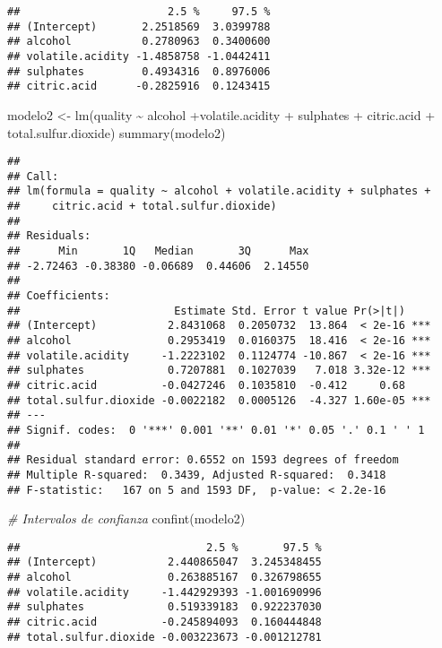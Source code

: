 \documentclass[
]{article}
\newenvironment{Shaded}{\begin{snugshade}}{\end{snugshade}}
\newcommand{\CommentTok}[1]{\textcolor[rgb]{0.56,0.35,0.01}{\textit{#1}}}
\newcommand{\FunctionTok}[1]{\textcolor[rgb]{0.00,0.00,0.00}{#1}}
\newcommand{\NormalTok}[1]{#1}
\newcommand{\OtherTok}[1]{\textcolor[rgb]{0.56,0.35,0.01}{#1}}
\newcommand{\SpecialCharTok}[1]{\textcolor[rgb]{0.00,0.00,0.00}{#1}}
\begin{document}
\begin{verbatim}
##                       2.5 %     97.5 %
## (Intercept)       2.2518569  3.0399788
## alcohol           0.2780963  0.3400600
## volatile.acidity -1.4858758 -1.0442411
## sulphates         0.4934316  0.8976006
## citric.acid      -0.2825916  0.1243415
\end{verbatim}

\begin{Shaded}
\begin{Highlighting}[]
\NormalTok{modelo2 }\OtherTok{\textless{}{-}} \FunctionTok{lm}\NormalTok{(quality }\SpecialCharTok{\textasciitilde{}}\NormalTok{ alcohol }\SpecialCharTok{+}\NormalTok{volatile.acidity }\SpecialCharTok{+}\NormalTok{ sulphates }\SpecialCharTok{+}\NormalTok{ citric.acid }\SpecialCharTok{+}\NormalTok{ total.sulfur.dioxide)}
\FunctionTok{summary}\NormalTok{(modelo2)}
\end{Highlighting}
\end{Shaded}

\begin{verbatim}
## 
## Call:
## lm(formula = quality ~ alcohol + volatile.acidity + sulphates + 
##     citric.acid + total.sulfur.dioxide)
## 
## Residuals:
##      Min       1Q   Median       3Q      Max 
## -2.72463 -0.38380 -0.06689  0.44606  2.14550 
## 
## Coefficients:
##                        Estimate Std. Error t value Pr(>|t|)    
## (Intercept)           2.8431068  0.2050732  13.864  < 2e-16 ***
## alcohol               0.2953419  0.0160375  18.416  < 2e-16 ***
## volatile.acidity     -1.2223102  0.1124774 -10.867  < 2e-16 ***
## sulphates             0.7207881  0.1027039   7.018 3.32e-12 ***
## citric.acid          -0.0427246  0.1035810  -0.412     0.68    
## total.sulfur.dioxide -0.0022182  0.0005126  -4.327 1.60e-05 ***
## ---
## Signif. codes:  0 '***' 0.001 '**' 0.01 '*' 0.05 '.' 0.1 ' ' 1
## 
## Residual standard error: 0.6552 on 1593 degrees of freedom
## Multiple R-squared:  0.3439, Adjusted R-squared:  0.3418 
## F-statistic:   167 on 5 and 1593 DF,  p-value: < 2.2e-16
\end{verbatim}

\begin{Shaded}
\begin{Highlighting}[]
\CommentTok{\# Intervalos de confianza}
\FunctionTok{confint}\NormalTok{(modelo2)}
\end{Highlighting}
\end{Shaded}

\begin{verbatim}
##                             2.5 %       97.5 %
## (Intercept)           2.440865047  3.245348455
## alcohol               0.263885167  0.326798655
## volatile.acidity     -1.442929393 -1.001690996
## sulphates             0.519339183  0.922237030
## citric.acid          -0.245894093  0.160444848
## total.sulfur.dioxide -0.003223673 -0.001212781
\end{verbatim}
\end{document}
